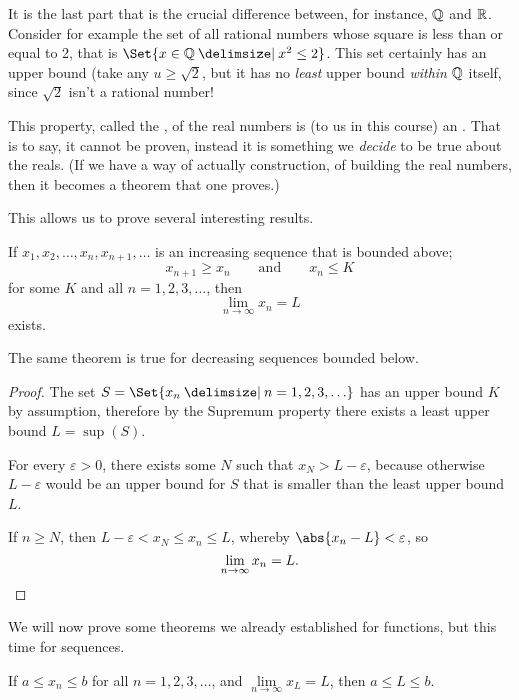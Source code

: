 \noindent
It is the last part that is the crucial difference between, for instance, $\mathbb{Q}$ and $\mathbb{R}$. Consider for example the set of all rational numbers whose square is less than or equal to 2, that is $\Set{x \in \Q \given x^2 \leq 2}$. This set certainly has an upper bound (take any $u \geq \sqrt{2}$, but it has no \emph{least} upper bound \emph{within} $\mathbb{Q}$ itself, since $\sqrt{2}$ isn't a rational number!

This property, called the , of the real numbers is (to us in this course) an . That is to say, it cannot be proven, instead it is something we \emph{decide} to be true about the reals. (If we have a way of actually construction, of building the real numbers, then it becomes a theorem that one proves.)

This allows us to prove several interesting results.

\begin{theorem}
	If $x_1, x_2, \ldots, x_n, x_{n + 1}, \ldots$ is an increasing sequence that is bounded above;
	\[
		x_{n + 1} \geq x_n \qquad \text{and} \qquad x_n \leq K
	\]
	for some $K$ and all $n = 1, 2, 3, \ldots$, then
	\[
		\lim_{n \to \infty} x_n = L
	\]
	exists.
\end{theorem}

\noindent
The same theorem is true for decreasing sequences bounded below.

\begin{proof}
	The set $S = \Set{x_n \given n = 1, 2, 3, \ldots}$ has an upper bound $K$ by assumption, therefore by the Supremum property there exists a least upper bound $L = \sup(S)$.

	For every $\varepsilon > 0$, there exists some $N$ such that $x_N > L - \varepsilon$, because otherwise $L - \varepsilon$ would be an upper bound for $S$ that is smaller than the least upper bound $L$.

	If $n \geq N$, then $L - \varepsilon < x_N \leq x_n \leq L$, whereby $\abs{x_n - L} < \varepsilon$, so
	\[
		\lim_{n \to \infty} x_n = L. \qedhere
	\]
\end{proof}

\noindent
We will now prove some theorems we already established for functions, but this time for sequences.

\begin{theorem}\label{lec9:seqbound}
	If $a \leq x_n \leq b$ for all $n = 1, 2, 3, \ldots$, and $\lim\limits_{n \to \infty} x_L = L$, then $a \leq L \leq b$.
\end{theorem}

